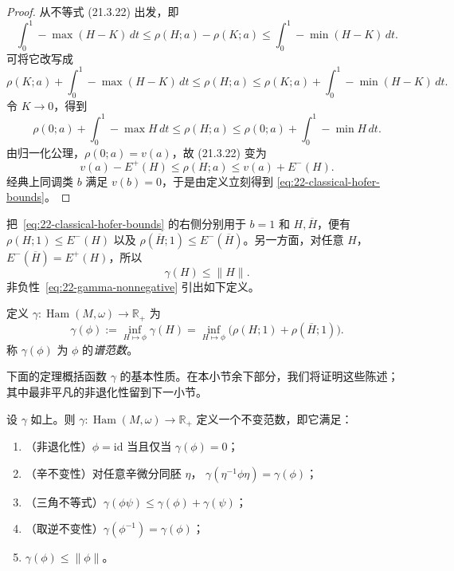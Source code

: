 \begin{proof}
从不等式 (21.3.22) 出发，即
\[
 \int_0^1-\max(H-K)\,dt
 \leq\rho(H;a)-\rho(K;a)
 \leq\int_0^1-\min(H-K)\,dt.
\]
可将它改写成
\[
 \rho(K;a)+\int_0^1-\max(H-K)\,dt
 \leq\rho(H;a)\leq
 \rho(K;a)+\int_0^1-\min(H-K)\,dt.
\]
令 $K\to0$，得到
\begin{equation}
 \rho(0;a)+\int_0^1-\max H\,dt
 \leq\rho(H;a)\leq
 \rho(0;a)+\int_0^1-\min H\,dt.
 \label{eq:22-zero-hamiltonian-bound}
\end{equation}
由归一化公理，$\rho(0;a)=v(a)$，故 (21.3.22) 变为
\[
 v(a)-E^+(H)\leq\rho(H;a)\leq v(a)+E^-(H).
\]
经典上同调类 $b$ 满足 $v(b)=0$，于是由定义立刻得到
\eqref{eq:22-classical-hofer-bounds}。
\end{proof}

把~\eqref{eq:22-classical-hofer-bounds} 的右侧分别用于 $b=1$ 和
$H,\overline H$，便有 $\rho(H;1)\leq E^-(H)$ 以及
$\rho(\overline H;1)\leq E^-(\overline H)$。另一方面，对任意 $H$，
$E^-(\overline H)=E^+(H)$，所以
\begin{equation}
 \gamma(H)\leq\lVert H\rVert.
 \label{eq:22-gamma-hofer-bound}
\end{equation}
非负性~\eqref{eq:22-gamma-nonnegative} 引出如下定义。

\begin{definition}
\label{def:22-spectral-norm}
定义 $\gamma:\operatorname{Ham}(M,\omega)\to\mathbb R_+$ 为
\[
 \gamma(\phi):=\inf_{H\mapsto\phi}\gamma(H)
 =\inf_{H\mapsto\phi}\bigl(\rho(H;1)+\rho(\overline H;1)\bigr).
\]
称 $\gamma(\phi)$ 为 $\phi$ 的\emph{谱范数}。
\end{definition}

下面的定理概括函数 $\gamma$ 的基本性质。在本小节余下部分，我们将证明这些陈述；
其中最非平凡的非退化性留到下一小节。

\begin{theorem}
\label{thm:22-spectral-norm-properties}
设 $\gamma$ 如上。则
$\gamma:\operatorname{Ham}(M,\omega)\to\mathbb R_+$ 定义一个不变范数，即它满足：
\begin{enumerate}
 \item （非退化性）$\phi=\mathrm{id}$ 当且仅当 $\gamma(\phi)=0$；
 \item （辛不变性）对任意辛微分同胚 $\eta$，
 $\gamma(\eta^{-1}\phi\eta)=\gamma(\phi)$；
 \item （三角不等式）$\gamma(\phi\psi)\leq\gamma(\phi)+\gamma(\psi)$；
 \item （取逆不变性）$\gamma(\phi^{-1})=\gamma(\phi)$；
 \item $\gamma(\phi)\leq\lVert\phi\rVert$。
\end{enumerate}
\end{theorem}

